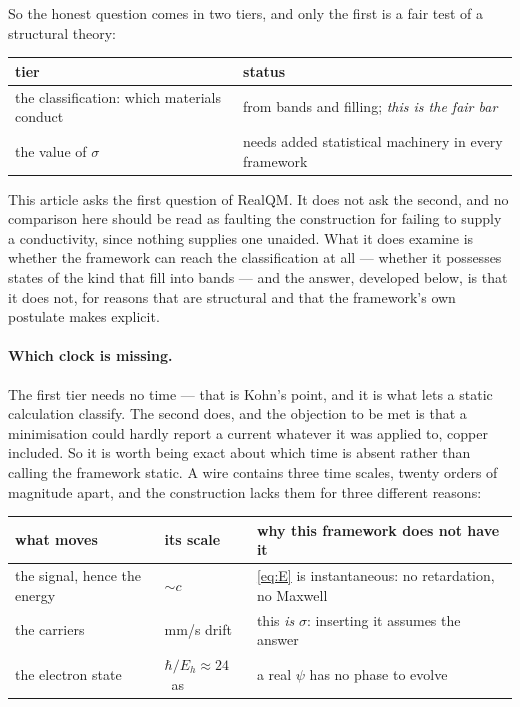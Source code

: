 \documentclass[11pt]{article}
\begin{document}
So the honest question comes in two tiers, and only the first is a fair test of a structural theory:

\begin{center}
\small
\begin{tabular}{@{}ll@{}}
\toprule
tier & status\\
\midrule
the classification: which materials conduct & from bands and filling; \emph{this is the fair bar}\\
the value of $\sigma$ & needs added statistical machinery in every framework\\
\bottomrule
\end{tabular}
\end{center}

\noindent This article asks the first question of RealQM. It does not ask the second, and no
comparison here should be read as faulting the construction for failing to supply a conductivity,
since nothing supplies one unaided. What it does examine is whether the framework can reach the
classification at all --- whether it possesses states of the kind that fill into bands --- and the
answer, developed below, is that it does not, for reasons that are structural and that the
framework's own postulate makes explicit.

\paragraph{Which clock is missing.} The first tier needs no time --- that is Kohn's point, and it is
what lets a static calculation classify. The second does, and the objection to be met is that a
minimisation could hardly report a current whatever it was applied to, copper included. So it is
worth being exact about which time is absent rather than calling the framework static. A wire
contains three time scales, twenty orders of magnitude apart, and the construction lacks them for
three different reasons:

\begin{center}
\small
\begin{tabular}{@{}lll@{}}
\toprule
what moves & its scale & why this framework does not have it\\
\midrule
the signal, hence the energy & $\sim c$ & \eqref{eq:E} is instantaneous: no retardation, no Maxwell\\
the carriers & mm/s drift & this \emph{is} $\sigma$: inserting it assumes the answer\\
the electron state & $\hbar/E_h\approx24$~as & a real $\psi$ has no phase to evolve\\
\bottomrule
\end{tabular}
\end{center}
\end{document}
